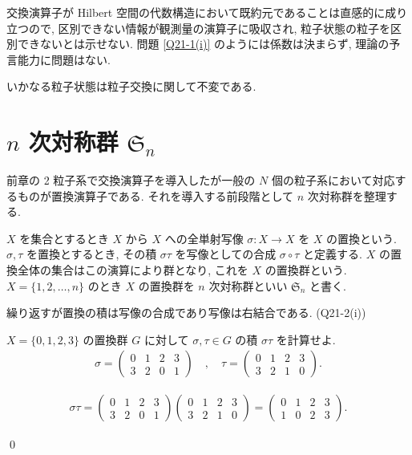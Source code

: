 \documentclass[uplatex,dvipdfmx,a4paper,11pt]{jlreq}
\makeatletter
\renewcommand{\SS}{\mathfrak{S}}
\numberwithin{equation}{section}
\theoremstyle{definition}
\renewenvironment{proof}[1][\proofname]{\par
  \normalfont
  \topsep6\p@\@plus6\p@ \trivlist
  \item[\hskip\labelsep{\bfseries #1}\@addpunct{\bfseries}]\ignorespaces\quad\par
}{
  \qed\endtrivlist\@endpefalse
}
\renewcommand\proofname{証明}
\makeatother
\begin{document}
\begin{problem}[Q21-1(xi)]
交換演算子が Hilbert 空間の代数構造において既約元であることは直感的に成り立つので, 区別できない情報が観測量の演算子に吸収され, 粒子状態の粒子を区別できないとは示せない. 問題 \ref{Q21-1(i)} のようには係数は決まらず, 理論の予言能力に問題はない.
\end{problem}


\begin{axiom}[対称化の要請]
  いかなる粒子状態は粒子交換に関して不変である.
\end{axiom}

\section{$n$ 次対称群 $\SS_n$}
前章の 2 粒子系で交換演算子を導入したが一般の $N$ 個の粒子系において対応するものが置換演算子である. それを導入する前段階として $n$ 次対称群を整理する.
\begin{definition}[$n$ 次対称群]
  $X$ を集合とするとき $X$ から $X$ への全単射写像 $\sigma: X\to X$ を $X$ の置換という.
  $\sigma,\tau$ を置換とするとき, その積 $\sigma\tau$ を写像としての合成 $\sigma\circ\tau$ と定義する. $X$ の置換全体の集合はこの演算により群となり, これを $X$ の置換群という.
  $X = \{1,2,\ldots,n\}$ のとき $X$ の置換群を $n$ 次対称群といい $\SS_n$ と書く.
\end{definition}
繰り返すが置換の積は写像の合成であり写像は右結合である. (Q21-2(i))
\begin{problem}[Q21-2(ii)]
$X = \{0, 1, 2, 3\}$ の置換群 $G$ に対して $\sigma,\tau\in G$ の積 $\sigma\tau$ を計算せよ.
\begin{align}
  \sigma = \begin{pmatrix}
             0 & 1 & 2 & 3 \\
             3 & 2 & 0 & 1
           \end{pmatrix} \quad , \quad
  \tau = \begin{pmatrix}
           0 & 1 & 2 & 3 \\
           3 & 2 & 1 & 0
         \end{pmatrix}.
\end{align}
\end{problem}
\begin{proof}
  \begin{align}
    \sigma\tau =
    \begin{pmatrix}
      0 & 1 & 2 & 3 \\
      3 & 2 & 0 & 1
    \end{pmatrix}
    \begin{pmatrix}
      0 & 1 & 2 & 3 \\
      3 & 2 & 1 & 0
    \end{pmatrix}
    =
    \begin{pmatrix}
      0 & 1 & 2 & 3 \\
      1 & 0 & 2 & 3
    \end{pmatrix}.
  \end{align}
\end{proof}
\end{document}
